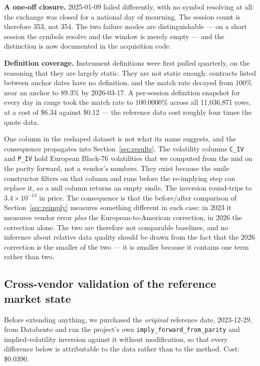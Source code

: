 \documentclass[11pt]{article}
\begin{document}
\textbf{A one-off closure.} 2025-01-09 failed differently, with no symbol resolving at
all: the exchange was closed for a national day of mourning. The session count is
therefore 353, not 354. The two failure modes are distinguishable --- on a short session
the symbols resolve and the window is merely empty --- and the distinction is now
documented in the acquisition code.

\textbf{Definition coverage.} Instrument definitions were first pulled quarterly, on the
reasoning that they are largely static. They are not static enough: contracts listed
between anchor dates have no definition, and the match rate decayed from $100\%$ near an
anchor to $89.3\%$ by 2026-03-17. A per-session definition snapshot for every day in
range took the match rate to $100.0000\%$ across all 11{,}036{,}871 rows, at a cost of
\$6.34 against \$0.12 --- the reference data cost roughly four times the quote data.

One column in the reshaped dataset is not what its name suggests, and the consequence
propagates into Section~\ref{sec:results}. The volatility columns \texttt{C\_IV} and
\texttt{P\_IV} hold European Black-76 volatilities that we computed from the mid on the
parity forward, not a vendor's numbers. They exist because the smile constructor filters
on that column and runs before the re-implying step can replace it, so a null column
returns an empty smile. The inversion round-trips to $3.4\times10^{-13}$ in price. The
consequence is that the before/after comparison of Section~\ref{sec:reimply} measures
something different in each case: in 2023 it measures vendor error \emph{plus} the
European-to-American correction, in 2026 the correction alone. The two are therefore not
comparable baselines, and no inference about relative data quality should be drawn from
the fact that the 2026 correction is the smaller of the two --- it is smaller because it
contains one term rather than two.

\subsection{Cross-vendor validation of the reference market state}
\label{sec:crossvendor}

Before extending anything, we purchased the \emph{original} reference date, 2023-12-29,
from Databento and ran the project's own \texttt{imply\_forward\_from\_parity} and
implied-volatility inversion against it without modification, so that every difference
below is attributable to the data rather than to the method. Cost: \$0.0390.
\end{document}
